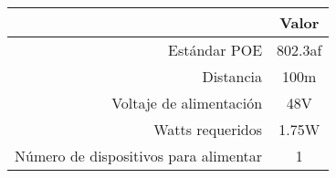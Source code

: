 \begin{tabular}{|r|c|}
  \hline
  \rowcolor[HTML]{E3FFE3} \multicolumn{1}{|c|}{Parámetro} & Valor \\
  \hline
  Estándar POE & 802.3af \\
  \hline
  Distancia & 100m \\
  \hline
  Voltaje de alimentación & 48V \\
  \hline
  Watts requeridos & 1.75W \\
  \hline
  Número de dispositivos para alimentar & 1 \\
  \hline
\end{tabular}